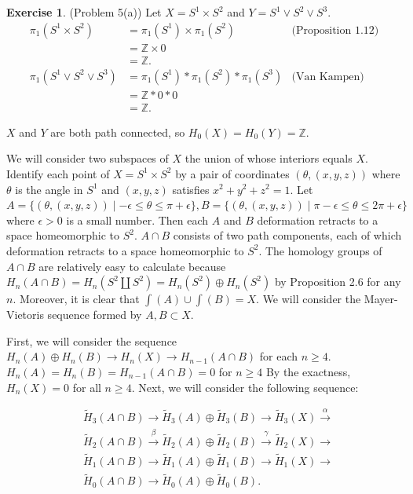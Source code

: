 \documentclass[12pt, psamsfonts]{amsart}
\theoremstyle{definition}
\newtheorem*{exer}{Exercise}
\theoremstyle{remark}
\numberwithin{equation}{section}
\begin{document}
\begin{exer}{(Problem 5(a))}
  Let $X = S^1 \times S^2$ and $Y = S^1 \vee S^2 \vee S^3$.
  \begin{align*}
    \pi_1(S^1 \times S^2)
      &= \pi_1(S^1) \times \pi_1(S^2) & \text{(Proposition 1.12)} \\
      &= \mathbb{Z} \times 0 \\
      &= \mathbb{Z}. \\
    \pi_1(S^1 \vee S^2 \vee S^3)
      &= \pi_1(S^1) * \pi_1(S^2) * \pi_1(S^3) & \text{(Van Kampen)} \\
      &= \mathbb{Z} * 0 * 0 \\
      &= \mathbb{Z}.
  \end{align*}

  $X$ and $Y$ are both path connected, so $H_0(X) = H_0(Y) = \mathbb{Z}$.

  We will consider two subspaces of $X$ the union of whose interiors equals $X$.
  Identify each point of $X = S^1 \times S^2$ by a pair of coordinates $(\theta, (x, y, z))$ where $\theta$ is the angle in $S^1$ and $(x, y, z)$ satisfies $x^2 + y^2 + z^2 = 1$.
  Let $A = \{ (\theta, (x, y, z)) \mid -\epsilon \leq \theta \leq \pi + \epsilon \}, B = \{ (\theta, (x, y, z)) \mid \pi - \epsilon \leq \theta \leq 2\pi + \epsilon \}$ where $\epsilon > 0$ is a small number.
  Then each $A$ and $B$ deformation retracts to a space homeomorphic to $S^2$.
  $A \cap B$ consists of two path components, each of which deformation retracts to a space homeomorphic to $S^2$.
  The homology groups of $A \cap B$ are relatively easy to calculate because $H_n(A \cap B) = H_n(S^2 \coprod S^2) = H_n(S^2) \oplus H_n(S^2)$ by Proposition 2.6 for any $n$.
  Moreover, it is clear that $\int(A) \cup \int(B) = X$.
  We will consider the Mayer-Vietoris sequence formed by $A, B \subset X$.

  First, we will consider the sequence $H_n(A) \oplus H_n(B) \rightarrow H_n(X) \rightarrow H_{n - 1}(A \cap B)$ for each $n \geq 4$.
  $H_n(A) = H_n(B) = H_{n - 1}(A \cap B) = 0$ for $n \geq 4$
  By the exactness, $H_n(X) = 0$ for all $n \geq 4$.
  Next, we will consider the following sequence:

  \begin{align*}
    &\tilde{H}_3(A \cap B) \rightarrow \tilde{H}_3(A) \oplus \tilde{H}_3(B) \rightarrow \tilde{H}_3(X) \xrightarrow{\alpha} \\
    &\tilde{H}_2(A \cap B) \xrightarrow{\beta} \tilde{H}_2(A) \oplus \tilde{H}_2(B) \xrightarrow{\gamma} \tilde{H}_2(X) \rightarrow \\
    &\tilde{H}_1(A \cap B) \rightarrow \tilde{H}_1(A) \oplus \tilde{H}_1(B) \rightarrow \tilde{H}_1(X) \rightarrow \\
    &\tilde{H}_0(A \cap B) \rightarrow \tilde{H}_0(A) \oplus \tilde{H}_0(B).
  \end{align*}


\end{exer}
\end{document}
